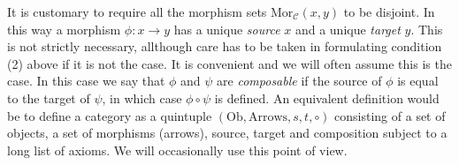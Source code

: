 \noindent
It is customary to require all the morphism sets
$\text{Mor}_{\mathcal{C}}(x,y)$ to be disjoint.
In this way a morphism $\phi: x \to y$ has a unique {\it source} $x$
and a unique {\it target} $y$. This is not strictly necessary,
allthough care has to be taken in formulating condition (2) above
if it is not the case. It is convenient and we will often assume
this is the case. In this case we say that $\phi$ and $\psi$ are
{\it composable} if the source of $\phi$ is equal to the 
target of $\psi$, in which case $\phi \circ \psi$ is defined.
An equivalent definition would be to define a category
as a quintuple $(\text{Ob}, \text{Arrows}, s, t, \circ)$
consisting of a set of objects, a set of morphisms (arrows),
source, target and composition subject to a long list of axioms.
We will occasionally use this point of view.

